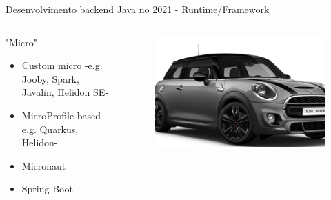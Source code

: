 \documentclass[aspectratio=169]{beamer}
\begin{document}
\begin{frame}{Desenvolvimento backend Java no 2021 - Runtime/Framework}

\begin{columns}
\begin{column}{0.5\textwidth}
"Micro"
\begin{itemize}
\item Custom micro -e.g. Jooby, Spark, Javalin, Helidon SE-
\item MicroProfile based -e.g. Quarkus, Helidon-
\item Micronaut
\item Spring Boot
\end{itemize}
\end{column}
\begin{column}{0.5\textwidth}  %
\begin{figure}
	\centering
	\includegraphics[width=0.9\linewidth]{Images/cooper}
\end{figure}
\end{column}
\end{columns}

\end{frame}
\end{document}

